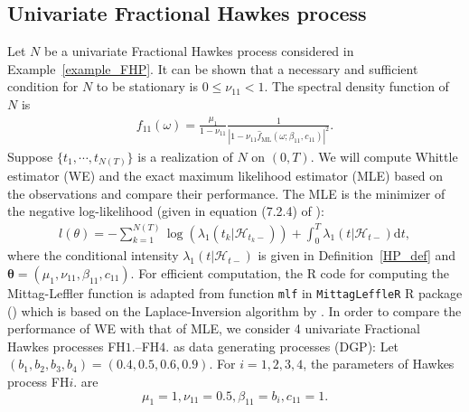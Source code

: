 \documentclass[11pt]{article}
\numberwithin{equation}{section}
\theoremstyle{plain}
\theoremstyle{definition}
\theoremstyle{definition}
\theoremstyle{assumption}
\theoremstyle{proposition}
\theoremstyle{proposition}
\theoremstyle{example}
\theoremstyle{lemma}
\theoremstyle{theorem}
\theoremstyle{remark}
\begin{document}
\subsection{Univariate Fractional Hawkes process}\label{example_univariate_FHP}
Let $N$ be a univariate Fractional Hawkes process considered in Example~\ref{example_FHP}. It can be shown that a necessary and sufficient condition for $N$ to be stationary is $0\leqslant\nu_{11}<1$. The spectral density function of $N$ is
\begin{align*}
f_{11}(\omega) = \frac{\mu_1}{1 - \nu_{11}}\frac{1}{|1 - \nu_{11}\hat{f}_{\mathrm{ML}}(\omega;\beta_{11},c_{11})|^2} .
\end{align*}
Suppose $\{t_1,\cdots,t_{N(T)}\}$ is a realization of $N$ on $(0,T)$. We will compute Whittle estimator (WE) and the exact maximum likelihood estimator (MLE) based on the observations and compare their performance. The MLE is the minimizer of the negative log-likelihood (given in equation (7.2.4) of \citet{Daley_and_Vere-Jones2003}):
\begin{align}\label{true_likelihood}
l(\theta) = -\sum_{k=1}^{N(T)} \log(\lambda_{1}(t_{k}|\mathcal{H}_{t_{k}-})) + \int_{0}^{T} \lambda_{1}(t|\mathcal{H}_{t-})\mathrm{d}t , 
\end{align}
where the conditional intensity $\lambda_{1}(t|\mathcal{H}_{t-})$ is given in Definition~\ref{HP_def} and $\boldsymbol{\theta} = (\mu_1,\nu_{11},\beta_{11},c_{11})$. For efficient computation, the R code for computing the Mittag-Leffler function is adapted from function \texttt{mlf} in \texttt{MittagLeffleR} R package (\citet{MittagLeffleR}) which is based on the Laplace-Inversion algorithm by \citet{Garrappa2015}. In order to compare the performance of WE with that of MLE, we consider 4 univariate Fractional Hawkes processes FH$1.$--FH$4.$ as data generating processes (DGP): Let $(b_1,b_2,b_3,b_4)= (0.4, 0.5, 0.6, 0.9)$. For $i=1,2,3,4$, the parameters of Hawkes process FH$i.$ are 
\begin{equation*}
\mu_1 = 1, \nu_{11} = 0.5, \beta_{11}=b_i, c_{11}=1. 
\end{equation*}  
\end{document}
